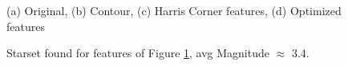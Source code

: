 \documentclass[paper=a4, fontsize=11pt]{scrartcl} %
\begin{document}
\begin{figure}[!h]
\caption{(a) Original, (b) Contour, (c) Harris Corner features, (d) Optimized features}
\label{sword}
\end{figure}

\begin{figure}[!h]
\caption{Starset found for features of Figure \ref{sword}, avg Magnitude $\approx$ 3.4. }
\label{swordss}
\end{figure}
\end{document}
